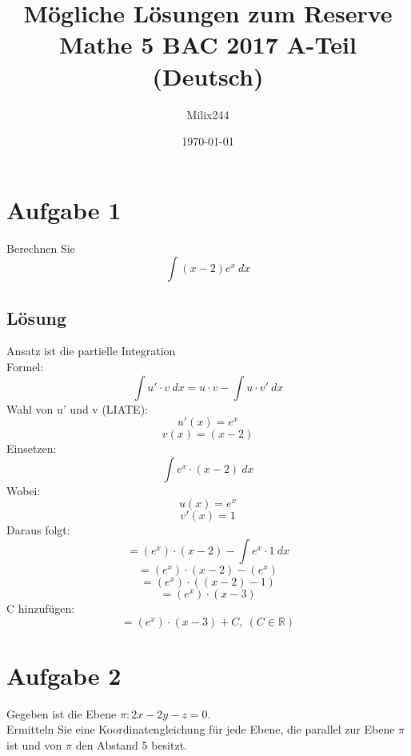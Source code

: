 \documentclass{article}
\title{Mögliche Lösungen zum Reserve Mathe 5 BAC 2017 A-Teil (Deutsch)}
\author{Milix244}
\date{\today}
\begin{document}
\maketitle

\section*{Aufgabe 1}
Berechnen Sie
\[\int(x-2)e^x\ dx\]

\subsection*{Lösung}
Ansatz ist die partielle Integration \\
Formel:
\[\int u'\cdot v\ dx=u\cdot v-\int u\cdot v'\ dx\]
Wahl von u' und v (LIATE):
\[u'(x)=e^x\]
\[v(x)=(x-2)\]
Einsetzen:
\[\int e^x\cdot (x-2)\ dx\]
Wobei:
\[u(x)=e^x\]
\[v'(x)=1\]
Daraus folgt:
\[=(e^x)\cdot (x-2)-\int e^x\cdot 1\ dx\]
\[=(e^x)\cdot (x-2)-(e^x)\]
\[=(e^x)\cdot ((x-2)-1)\]
\[=(e^x)\cdot (x-3)\]
C hinzufügen:
\[=(e^x)\cdot (x-3)+C,\ (C\in\mathbb{R})\]

\section*{Aufgabe 2}
Gegeben ist die Ebene \(\pi :2x-2y-z=0\). \\
Ermitteln Sie eine Koordinatengleichung für jede Ebene, die parallel zur
Ebene \(\pi\) ist und von \(\pi\) den Abstand 5 besitzt.
\end{document}
